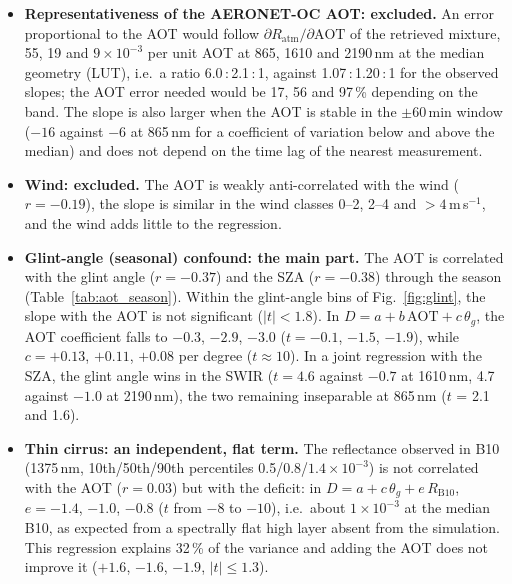 \documentclass[11pt,a4paper]{article}
\begin{document}
\begin{itemize}
\item \textbf{Representativeness of the AERONET-OC AOT: excluded.} An error proportional to the AOT would follow
  $\partial R_\mathrm{atm}/\partial\mathrm{AOT}$ of the retrieved mixture, 55, 19 and $9\times10^{-3}$ per unit AOT at
  865, 1610 and 2190\,nm at the median geometry (LUT), i.e.\ a ratio 6.0\,:\,2.1\,:\,1, against 1.07\,:\,1.20\,:\,1 for
  the observed slopes; the AOT error needed would be 17, 56 and 97\,\% depending on the band. The slope is also
  larger when the AOT is stable in the $\pm60$\,min window ($-16$ against $-6$ at 865\,nm for a coefficient of
  variation below and above the median) and does not depend on the time lag of the nearest measurement.
\item \textbf{Wind: excluded.} The AOT is weakly anti-correlated with the wind ($r=-0.19$), the slope is similar in
  the wind classes 0--2, 2--4 and $>4$\,m\,s$^{-1}$, and the wind adds little to the regression.
\item \textbf{Glint-angle (seasonal) confound: the main part.} The AOT is correlated with the glint angle
  ($r=-0.37$) and the SZA ($r=-0.38$) through the season (Table~\ref{tab:aot_season}). Within the glint-angle bins
  of Fig.~\ref{fig:glint}, the slope with the AOT is not significant ($|t|<1.8$). In $D = a + b\,\mathrm{AOT} +
  c\,\theta_g$, the AOT coefficient falls to $-0.3$, $-2.9$, $-3.0$ ($t = -0.1$, $-1.5$, $-1.9$), while
  $c = +0.13$, $+0.11$, $+0.08$ per degree ($t\approx10$). In a joint regression with the SZA, the glint angle wins
  in the SWIR ($t = 4.6$ against $-0.7$ at 1610\,nm, 4.7 against $-1.0$ at 2190\,nm), the two remaining
  inseparable at 865\,nm ($t$ = 2.1 and 1.6).
\item \textbf{Thin cirrus: an independent, flat term.} The reflectance observed in B10 (1375\,nm, 10th/50th/90th
  percentiles 0.5/0.8/$1.4\times10^{-3}$) is not correlated with the AOT ($r=0.03$) but with the deficit: in
  $D = a + c\,\theta_g + e\,R_\mathrm{B10}$, $e = -1.4$, $-1.0$, $-0.8$ ($t$ from $-8$ to $-10$), i.e.\ about
  $1\times10^{-3}$ at the median B10, as expected from a spectrally flat high layer absent from the simulation.
  This regression explains 32\,\% of the variance and adding the AOT does not improve it ($+1.6$, $-1.6$, $-1.9$,
  $|t|\le1.3$).
\end{itemize}
\end{document}
